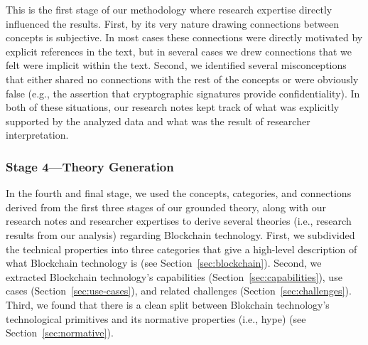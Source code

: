
This is the first stage of our methodology where research expertise directly influenced the results.
First, by its very nature drawing connections between concepts is subjective.
In most cases these connections were directly motivated by explicit references in the text, but in several cases we drew connections that we felt were implicit within the text.
Second, we identified several misconceptions that either shared no connections with the rest of the concepts or were obviously false (e.g., the assertion that cryptographic signatures provide confidentiality).
In both of these situations, our research notes kept track of what was explicitly supported by the analyzed data and what was the result of researcher interpretation.

\subsubsection{Stage 4---Theory Generation}
In the fourth and final stage, we used the concepts, categories, and connections derived from the first three stages of our grounded theory, along with our research notes and researcher expertises to derive several theories (i.e., research results from our analysis) regarding Blockchain technology.
First, we subdivided the technical properties into three categories that give a high-level description of what Blockchain technology is (see Section~\ref{sec:blockchain}).
Second, we extracted Blockchain technology's capabilities (Section~\ref{sec:capabilities}), use cases (Section~\ref{sec:use-cases}), and related challenges (Section~\ref{sec:challenges}).
Third, we found that there is a clean split between Blokchain technology's technological primitives and its normative properties (i.e., hype) (see Section~\ref{sec:normative}).


